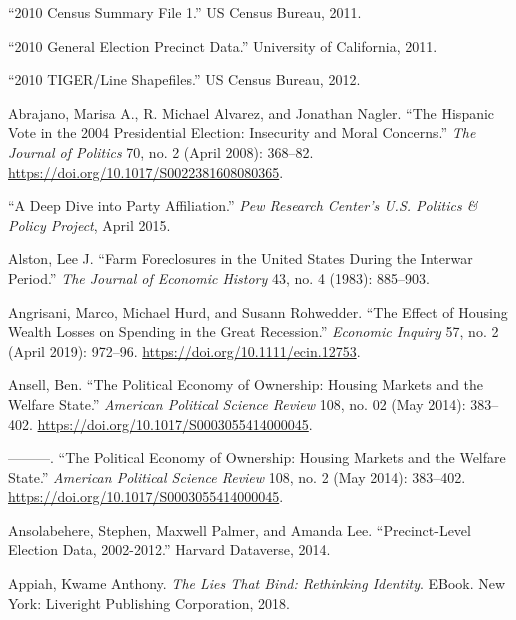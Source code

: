 \documentclass[12pt,oneside]{psthesis}
\begin{document}
\leavevmode\hypertarget{ref-20112010b}{}%
``2010 Census Summary File 1.'' US Census Bureau, 2011.

\leavevmode\hypertarget{ref-20112010}{}%
``2010 General Election Precinct Data.'' University of California, 2011.

\leavevmode\hypertarget{ref-20122010}{}%
``2010 TIGER/Line Shapefiles.'' US Census Bureau, 2012.

\leavevmode\hypertarget{ref-abrajano2008hispanic}{}%
Abrajano, Marisa A., R. Michael Alvarez, and Jonathan Nagler. ``The Hispanic Vote in the 2004 Presidential Election: Insecurity and Moral Concerns.'' \emph{The Journal of Politics} 70, no. 2 (April 2008): 368--82. \url{https://doi.org/10.1017/S0022381608080365}.

\leavevmode\hypertarget{ref-2015deep}{}%
``A Deep Dive into Party Affiliation.'' \emph{Pew Research Center's U.S. Politics \& Policy Project}, April 2015.

\leavevmode\hypertarget{ref-alston1983farm}{}%
Alston, Lee J. ``Farm Foreclosures in the United States During the Interwar Period.'' \emph{The Journal of Economic History} 43, no. 4 (1983): 885--903.

\leavevmode\hypertarget{ref-angrisani2019effect}{}%
Angrisani, Marco, Michael Hurd, and Susann Rohwedder. ``The Effect of Housing Wealth Losses on Spending in the Great Recession.'' \emph{Economic Inquiry} 57, no. 2 (April 2019): 972--96. \url{https://doi.org/10.1111/ecin.12753}.

\leavevmode\hypertarget{ref-ansellPoliticalEconomyOwnership2014}{}%
Ansell, Ben. ``The Political Economy of Ownership: Housing Markets and the Welfare State.'' \emph{American Political Science Review} 108, no. 02 (May 2014): 383--402. \url{https://doi.org/10.1017/S0003055414000045}.

\leavevmode\hypertarget{ref-ansellPoliticalEconomyOwnership2014a}{}%
---------. ``The Political Economy of Ownership: Housing Markets and the Welfare State.'' \emph{American Political Science Review} 108, no. 2 (May 2014): 383--402. \url{https://doi.org/10.1017/S0003055414000045}.

\leavevmode\hypertarget{ref-ansolabehere2014precinctlevel}{}%
Ansolabehere, Stephen, Maxwell Palmer, and Amanda Lee. ``Precinct-Level Election Data, 2002-2012.'' Harvard Dataverse, 2014.

\leavevmode\hypertarget{ref-appiah2018lies}{}%
Appiah, Kwame Anthony. \emph{The Lies That Bind: Rethinking Identity}. EBook. New York: Liveright Publishing Corporation, 2018.
\end{document}
